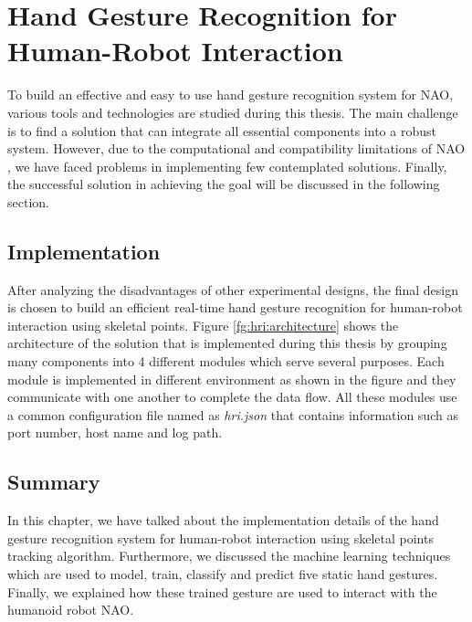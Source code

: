 \chapter{Hand Gesture Recognition for Human-Robot Interaction} \label{ch:solution} To build an effective and easy to use hand gesture recognition system for NAO, various tools and technologies are studied during this thesis. The main challenge is to find a solution that can integrate all essential components into a robust system. However, due to the computational and compatibility limitations of NAO \cite{17}, we have faced problems in implementing few contemplated solutions. Finally, the successful solution in achieving the goal will be discussed in the following section.

\section{Implementation} \label{sec:sol:impl} After analyzing the disadvantages of other experimental designs, the final design is chosen to build an efficient real-time hand gesture recognition for human-robot interaction using skeletal points. Figure \ref{fg:hri:architecture} shows the architecture of the solution that is implemented during this thesis by grouping many components into 4 different modules which serve several purposes. Each module is implemented in different environment as shown in the figure and they communicate with one another to complete the data flow. All these modules use a common configuration file named as \textit{hri.json} that contains information such as port number, host name and log path.




 







\section{Summary}
In this chapter, we have talked about the implementation details of the hand gesture recognition system for human-robot interaction using skeletal points tracking algorithm. Furthermore, we discussed the machine learning techniques which are used to model, train, classify and predict five static hand gestures. Finally, we explained how these trained gesture are used to interact with the humanoid robot NAO.